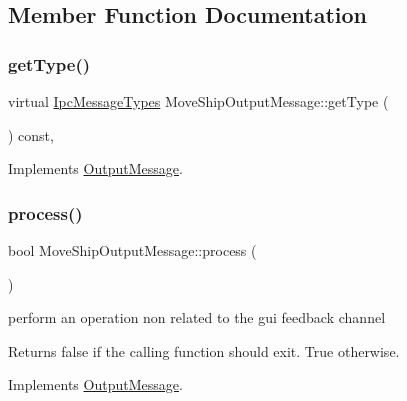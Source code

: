 \subsection{Member Function Documentation}
\mbox{\label{class_move_ship_output_message_ae90a05ef8c71c5d5d0c2be4b5b540b9b}} 
\subsubsection{\texorpdfstring{getType()}{getType()}}
{\footnotesize\ttfamily virtual \mbox{\hyperlink{ipcmsgtypes_8h_a59f75a61492e64aebfae0cc49cc26683}{Ipc\+Message\+Types}} Move\+Ship\+Output\+Message\+::get\+Type (\begin{DoxyParamCaption}{ }\end{DoxyParamCaption}) const\hspace{0.3cm}{\ttfamily [inline]}, {\ttfamily [virtual]}}



Implements \mbox{\hyperlink{class_output_message_adfc965910862cd236e437e3050aee176}{Output\+Message}}.

\mbox{\label{class_move_ship_output_message_aca14c61d3c88d156378bb999efac22dc}} 
\subsubsection{\texorpdfstring{process()}{process()}}
{\footnotesize\ttfamily bool Move\+Ship\+Output\+Message\+::process (\begin{DoxyParamCaption}{ }\end{DoxyParamCaption})\hspace{0.3cm}{\ttfamily [virtual]}}



perform an operation non related to the gui feedback channel 

\begin{DoxyReturn}{Returns}
false if the calling function should exit. True otherwise. 
\end{DoxyReturn}


Implements \mbox{\hyperlink{class_output_message_a949d8350d98202608e4248fe6dafa10f}{Output\+Message}}.

